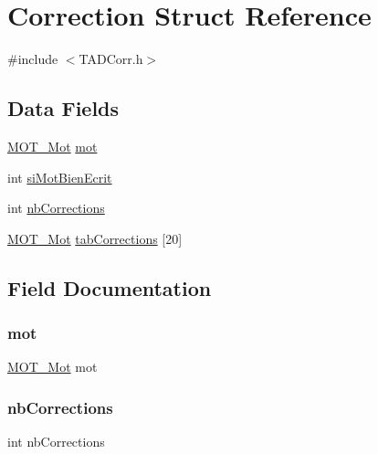 \hypertarget{struct_correction}{}\section{Correction Struct Reference}
\label{struct_correction}


{\ttfamily \#include $<$T\+A\+D\+Corr.\+h$>$}

\subsection*{Data Fields}
\begin{DoxyCompactItemize}
\item 
\hyperlink{_mot_8h_af7ff2707bf2a933895e650ae9490ca4d}{M\+O\+T\+\_\+\+Mot} \hyperlink{struct_correction_ac87c7b40c6dcc700bf7b234443e0d951}{mot}
\item 
int \hyperlink{struct_correction_a5c8c9153308e1bff754421d05d846cb7}{si\+Mot\+Bien\+Ecrit}
\item 
int \hyperlink{struct_correction_af86d96f695c47c8e4cb4f95acbe41eba}{nb\+Corrections}
\item 
\hyperlink{_mot_8h_af7ff2707bf2a933895e650ae9490ca4d}{M\+O\+T\+\_\+\+Mot} \hyperlink{struct_correction_aece7d22ea125eca3e364ec39d004b6f4}{tab\+Corrections} \mbox{[}20\mbox{]}
\end{DoxyCompactItemize}


\subsection{Field Documentation}
\mbox{\label{struct_correction_ac87c7b40c6dcc700bf7b234443e0d951}} 
\subsubsection{\texorpdfstring{mot}{mot}}
{\footnotesize\ttfamily \hyperlink{_mot_8h_af7ff2707bf2a933895e650ae9490ca4d}{M\+O\+T\+\_\+\+Mot} mot}

\mbox{\label{struct_correction_af86d96f695c47c8e4cb4f95acbe41eba}} 
\subsubsection{\texorpdfstring{nb\+Corrections}{nbCorrections}}
{\footnotesize\ttfamily int nb\+Corrections}

